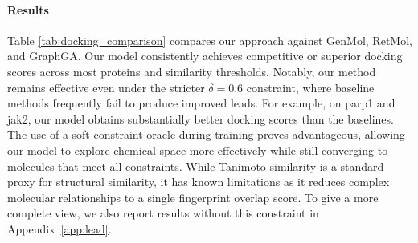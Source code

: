 \documentclass{article} %
\begin{document}
\paragraph{Results}
Table \ref{tab:docking_comparison} compares our approach against GenMol, RetMol, and GraphGA. Our model consistently achieves competitive or superior docking scores across most proteins and similarity thresholds. Notably, our method remains effective even under the stricter $\delta = 0.6$ constraint, where baseline methods frequently fail to produce improved leads. For example, on parp1 and jak2, our model obtains substantially better docking scores than the baselines. The use of a soft-constraint oracle during training proves advantageous, allowing our model to explore chemical space more effectively while still converging to molecules that meet all constraints. While Tanimoto similarity is a standard proxy for structural similarity, it has known limitations as it reduces complex molecular relationships to a single fingerprint overlap score. To give a more complete view, we also report results without this constraint in Appendix~\ref{app:lead}.
\end{document}
